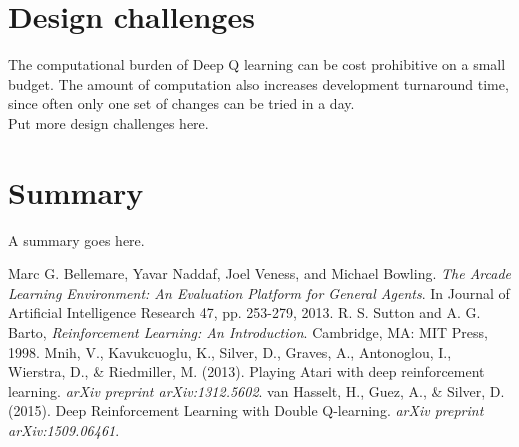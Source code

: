 \documentclass{article}
\begin{document}
\section{Design challenges}
The computational burden of Deep Q learning can be cost prohibitive on a small budget. The amount of computation also increases development turnaround time, since often only one set of changes can be tried in a day. \\

Put more design challenges here.

\section{Summary}
A summary goes here.


\begin{thebibliography}{1}
 Marc G. Bellemare, Yavar Naddaf, Joel Veness, and Michael Bowling. {\em The Arcade Learning Environment: An Evaluation Platform for General Agents}. In Journal of Artificial Intelligence Research 47, pp. 253-279, 2013.
 R. S. Sutton and A. G. Barto, {\em Reinforcement Learning: An Introduction}. Cambridge, MA: MIT Press, 1998.
 Mnih, V., Kavukcuoglu, K., Silver, D., Graves, A., Antonoglou, I., Wierstra, D., \& Riedmiller, M. (2013). Playing Atari with deep reinforcement learning. \textit{arXiv preprint arXiv:1312.5602}.
 van Hasselt, H., Guez, A., \& Silver, D. (2015). Deep Reinforcement Learning with Double Q-learning. \textit{arXiv preprint arXiv:1509.06461}.
\end{thebibliography}



\pagebreak
\end{document}
